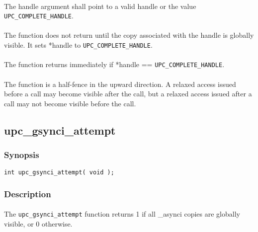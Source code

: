\documentclass[10pt]{article}
\def \complete {{\tt UPC\_COMPLETE\_HANDLE}}
\begin{document}
\paragraph{} The handle argument shall point to a valid handle or the value
\complete{}.

\paragraph{} The \function{} function does not return until the copy associated
with the handle is globally visible.  It sets *handle to \complete{}.

\paragraph{} The \function{} function returns immediately if *handle ==
\complete{}.

\paragraph{} The \function{} function is a half-fence in the upward direction.
A relaxed access issued before a \function{} call may become visible after the
call, but a relaxed access issued after a \function{} call may not become
visible before the call.

\newpage
\subsection{upc\_gsynci\_attempt}
\def\function{{\tt upc\_gsynci\_attempt}}

\subsubsection{Synopsis}

\begin{verbatim}
int upc_gsynci_attempt( void );
\end{verbatim}

\subsubsection{Description}

\paragraph{} The \function{} function returns 1 if all \_asynci copies are
globally visible, or 0 otherwise.
\end{document}
